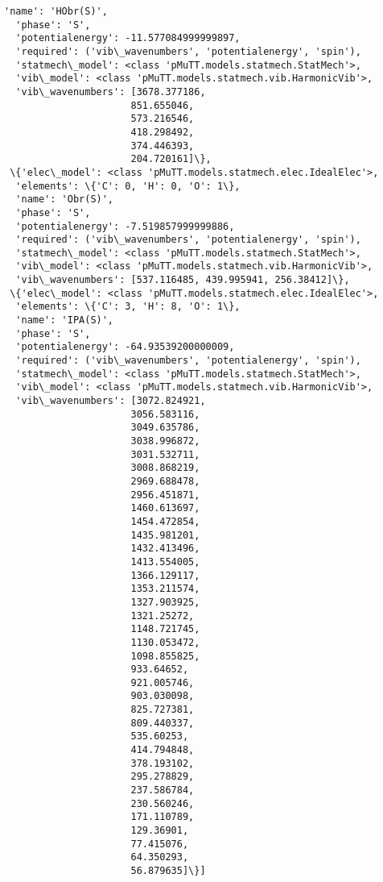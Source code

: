 \documentclass[11pt]{article}
\begin{document}
\begin{Verbatim}[commandchars=\\\{\}]
  'name': 'HObr(S)',
  'phase': 'S',
  'potentialenergy': -11.577084999999897,
  'required': ('vib\_wavenumbers', 'potentialenergy', 'spin'),
  'statmech\_model': <class 'pMuTT.models.statmech.StatMech'>,
  'vib\_model': <class 'pMuTT.models.statmech.vib.HarmonicVib'>,
  'vib\_wavenumbers': [3678.377186,
                      851.655046,
                      573.216546,
                      418.298492,
                      374.446393,
                      204.720161]\},
 \{'elec\_model': <class 'pMuTT.models.statmech.elec.IdealElec'>,
  'elements': \{'C': 0, 'H': 0, 'O': 1\},
  'name': 'Obr(S)',
  'phase': 'S',
  'potentialenergy': -7.519857999999886,
  'required': ('vib\_wavenumbers', 'potentialenergy', 'spin'),
  'statmech\_model': <class 'pMuTT.models.statmech.StatMech'>,
  'vib\_model': <class 'pMuTT.models.statmech.vib.HarmonicVib'>,
  'vib\_wavenumbers': [537.116485, 439.995941, 256.38412]\},
 \{'elec\_model': <class 'pMuTT.models.statmech.elec.IdealElec'>,
  'elements': \{'C': 3, 'H': 8, 'O': 1\},
  'name': 'IPA(S)',
  'phase': 'S',
  'potentialenergy': -64.93539200000009,
  'required': ('vib\_wavenumbers', 'potentialenergy', 'spin'),
  'statmech\_model': <class 'pMuTT.models.statmech.StatMech'>,
  'vib\_model': <class 'pMuTT.models.statmech.vib.HarmonicVib'>,
  'vib\_wavenumbers': [3072.824921,
                      3056.583116,
                      3049.635786,
                      3038.996872,
                      3031.532711,
                      3008.868219,
                      2969.688478,
                      2956.451871,
                      1460.613697,
                      1454.472854,
                      1435.981201,
                      1432.413496,
                      1413.554005,
                      1366.129117,
                      1353.211574,
                      1327.903925,
                      1321.25272,
                      1148.721745,
                      1130.053472,
                      1098.855825,
                      933.64652,
                      921.005746,
                      903.030098,
                      825.727381,
                      809.440337,
                      535.60253,
                      414.794848,
                      378.193102,
                      295.278829,
                      237.586784,
                      230.560246,
                      171.110789,
                      129.36901,
                      77.415076,
                      64.350293,
                      56.879635]\}]

    \end{Verbatim}
\end{document}
